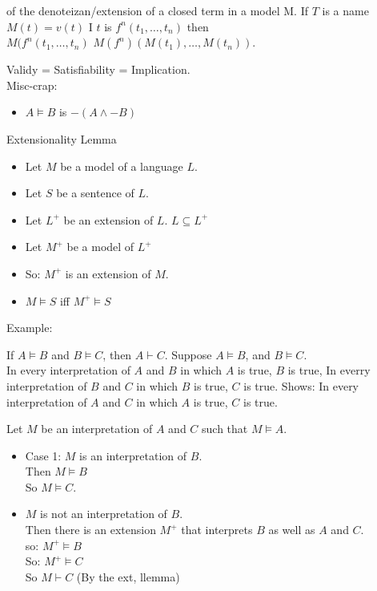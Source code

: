 \begin{definition}
of the denoteizan/extension of a closed term in a model M.
If $T$ is a name $M(t) = v(t)$
I $t$ is $f^n(t_1,\dots,t_n)$
then \\
$M(f^n(t_1,\dots,t_n)$
$M(f^n)(M(t_1),\dots,M(t_n)).$
\end{definition}

Validy = Satisfiability = Implication.\\

Misc-crap:
\begin{itemize}
\item $A \vDash B$ is $-(A \wedge -B)$
\end{itemize}

\begin{lemma}
Extensionality Lemma\\
\begin{itemize}
\item Let $M$ be a model of a language $L$.
\item Let $S$ be a sentence of $L$.
\item Let $L^+$ be an extension of $L$. $L \subseteq L^+$
\item Let $M^+$ be a model of $L^+$
\item So: $M^+$ is an extension of $M$.
\item $M \vDash S$ iff $ M^+ \vDash S$
\end{itemize}
\end{lemma}
Example:

If $A \vDash B$ and $B \vDash C$, then $A \vdash C$.
Suppose $A \vDash B$, and $B \vDash C$.\\
In every interpretation of $A$ and $B$ in which $A$ is true, $B$ is true,
In everry interpretation of $B$ and $C$ in which $B$ is true, $C$ is true.
Shows: In every interpretation of $A$ and $C$ in which $A$ is true, $C$ is true.

Let $M$ be an interpretation of $A$ and $C$ such that $M \vDash A$.
\begin{itemize}
\item Case 1:
$M$ is an interpretation of $B$. \\
Then $M \vDash B$ \\
So $M \vDash C$. \\
\item $M$ is not an interpretation of $B$. \\
Then there is an extension $M^+$ that interprets $B$ as well as $A$ and $C$. \\
so: $M^+ \vDash B$ \\
So: $M^+ \vDash C$ \\
So $M \vdash C$ (By the ext, llemma) \\
\end{itemize}


